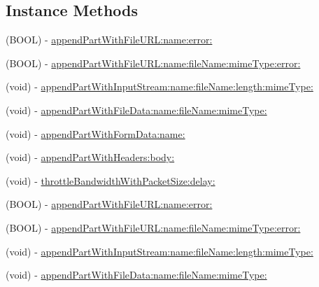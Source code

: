 \subsection*{Instance Methods}
\begin{DoxyCompactItemize}
\item 
(B\+O\+OL) -\/ \mbox{\hyperlink{protocol_a_f_multipart_form_data-p_ad6dd9d19605afe113ab0f5198224d127}{append\+Part\+With\+File\+U\+R\+L\+:name\+:error\+:}}
\item 
(B\+O\+OL) -\/ \mbox{\hyperlink{protocol_a_f_multipart_form_data-p_a514cde0ae1c0da63a9e5801dabd830b9}{append\+Part\+With\+File\+U\+R\+L\+:name\+:file\+Name\+:mime\+Type\+:error\+:}}
\item 
(void) -\/ \mbox{\hyperlink{protocol_a_f_multipart_form_data-p_aa8e577ad5f3171bf618c12e1ee45b8ab}{append\+Part\+With\+Input\+Stream\+:name\+:file\+Name\+:length\+:mime\+Type\+:}}
\item 
(void) -\/ \mbox{\hyperlink{protocol_a_f_multipart_form_data-p_a47b204592fb8a4ad0750ee4c24baa43f}{append\+Part\+With\+File\+Data\+:name\+:file\+Name\+:mime\+Type\+:}}
\item 
(void) -\/ \mbox{\hyperlink{protocol_a_f_multipart_form_data-p_a6bfed0a6d12546d88ecb9ce90c6affb5}{append\+Part\+With\+Form\+Data\+:name\+:}}
\item 
(void) -\/ \mbox{\hyperlink{protocol_a_f_multipart_form_data-p_a536920b65bcc076f33cb823ebb76ecc0}{append\+Part\+With\+Headers\+:body\+:}}
\item 
(void) -\/ \mbox{\hyperlink{protocol_a_f_multipart_form_data-p_a6c60c3d0ab6d679fe548106efc147708}{throttle\+Bandwidth\+With\+Packet\+Size\+:delay\+:}}
\item 
(B\+O\+OL) -\/ \mbox{\hyperlink{protocol_a_f_multipart_form_data-p_ad6dd9d19605afe113ab0f5198224d127}{append\+Part\+With\+File\+U\+R\+L\+:name\+:error\+:}}
\item 
(B\+O\+OL) -\/ \mbox{\hyperlink{protocol_a_f_multipart_form_data-p_a514cde0ae1c0da63a9e5801dabd830b9}{append\+Part\+With\+File\+U\+R\+L\+:name\+:file\+Name\+:mime\+Type\+:error\+:}}
\item 
(void) -\/ \mbox{\hyperlink{protocol_a_f_multipart_form_data-p_aa8e577ad5f3171bf618c12e1ee45b8ab}{append\+Part\+With\+Input\+Stream\+:name\+:file\+Name\+:length\+:mime\+Type\+:}}
\item 
(void) -\/ \mbox{\hyperlink{protocol_a_f_multipart_form_data-p_a47b204592fb8a4ad0750ee4c24baa43f}{append\+Part\+With\+File\+Data\+:name\+:file\+Name\+:mime\+Type\+:}}
\item 

\end{DoxyCompactItemize}
